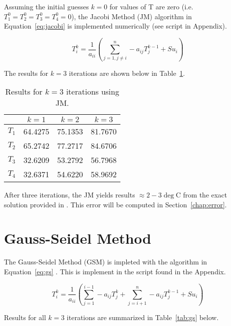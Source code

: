 Assuming the initial guesses $k=0$ for values of T are zero (i.e. $T_1^0=T_2^0=T_3^0=T_4^0=0$), the Jacobi Method (JM) algorithm in Equation~\ref{eq:jacobi} \cite{cfdbook} is implemented numerically (see script \cite{python} in Appendix).

\begin{equation}
	\label{eq:jacobi}	
	T_i^k = \frac{1}{a_{ii}} \left( \sum_{j=1, j \neq i}^{n} - a_{ij} T_j^{k-1}  + Su_i \right)
\end{equation}

The results for $k=3$ iterations are shown below in Table~\ref{tab:jac}.

\begin{table}[H]
  \centering
  \caption{Results for $k=3$ iterations using JM.}
    \begin{tabular}{cccc}
    & \textbf{$k=1$} & \textbf{$k=2$} & \textbf{$k=3$} \\
    \midrule
    \textbf{$T_1$} & 64.4275 & 75.1353 & 81.7670 \\
    \textbf{$T_2$} & 65.2742 & 77.2717 & 84.6706 \\
    \textbf{$T_3$} & 32.6209 & 53.2792 & 56.7968 \\
    \textbf{$T_4$} & 32.6371 & 54.6220 & 58.9692 \\
    \end{tabular}
  \label{tab:jac}
\end{table}

After three iterations, the JM yields results $\approx 2-3 \deg$C from the exact solution provided in \cite{assign}. This error will be computed in Section~\ref{chap:error}.

\chapter{Gauss-Seidel Method}
\label{chap:gauss}

The Gauss-Seidel Method (GSM) is impleted with the algorithm in Equation~\ref{eq:gs} \cite{cfdbook}. This is implement in the script found in the Appendix.

\begin{equation}
	\label{eq:gs}	
	T_i^k = \frac{1}{a_{ii}} \left( \sum_{j=1}^{i-1} - a_{ij} T_j^k  + \sum_{j=i+1}^{n} - a_{ij} T_j^{k-1} + Su_i \right)
\end{equation}

Results for all $k=3$ iterations are summarized in Table~\ref{tab:gs} below.


